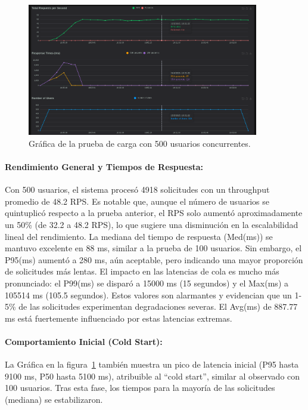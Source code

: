 \begin{figure}[H]
\centering
\includegraphics[width=0.9\textwidth]{figures/08_500_1.png}
\caption{Gráfica de la prueba de carga con 500 usuarios concurrentes.}
\label{fig:locust500}
\end{figure}

\paragraph{Rendimiento General y Tiempos de Respuesta:}
Con 500 usuarios, el sistema procesó 4918 solicitudes con un throughput promedio de 48.2 RPS. Es notable que, aunque el número de usuarios se quintuplicó respecto a la prueba anterior, el RPS solo aumentó aproximadamente un 50\% (de 32.2 a 48.2 RPS), lo que sugiere una disminución en la escalabilidad lineal del rendimiento.
La mediana del tiempo de respuesta (Med(ms)) se mantuvo excelente en 88 ms, similar a la prueba de 100 usuarios. Sin embargo, el P95(ms) aumentó a 280 ms, aún aceptable, pero indicando una mayor proporción de solicitudes más lentas.
El impacto en las latencias de cola es mucho más pronunciado: el P99(ms) se disparó a 15000 ms (15 segundos) y el Max(ms) a 105514 ms (105.5 segundos). Estos valores son alarmantes y evidencian que un 1-5\% de las solicitudes experimentan degradaciones severas. El Avg(ms) de 887.77 ms está fuertemente influenciado por estas latencias extremas.

\paragraph{Comportamiento Inicial (Cold Start):}
La Gráfica en la figura~\ref{fig:locust500} también muestra un pico de latencia inicial (P95 hasta 9100 ms, P50 hasta 5100 ms), atribuible al ``cold start'', similar al observado con 100 usuarios. Tras esta fase, los tiempos para la mayoría de las solicitudes (mediana) se estabilizaron.

